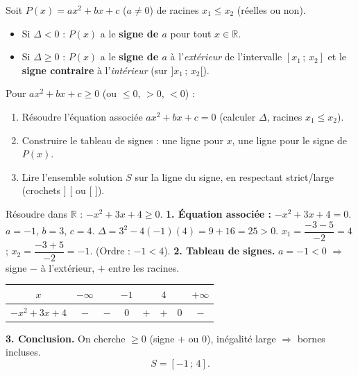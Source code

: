 \documentclass[11pt]{article}
\newcommand{\cle}[1]{{\popxbold\color{popdark}#1}}
\begin{document}
\begin{propriete}
Soit $P(x)=ax^2+bx+c$ ($a\neq 0$) de racines $x_1\leq x_2$ (réelles ou non).
\begin{itemize}
\item Si $\Delta<0$ : $P(x)$ a le \textbf{signe de $a$} pour tout $x\in\mathbb{R}$.
\item Si $\Delta\geq 0$ : $P(x)$ a le \textbf{signe de $a$} à l'\emph{extérieur} de l'intervalle $[x_1\,;\,x_2]$ et le \textbf{signe contraire} à l'\emph{intérieur} (sur $]x_1\,;\,x_2[$).
\end{itemize}
\end{propriete}

\begin{methode}
Pour $ax^2+bx+c \geq 0$ (ou $\leq 0$, $>0$, $<0$) :
\begin{enumerate}
\item Résoudre l'équation associée $ax^2+bx+c=0$ (calculer $\Delta$, racines $x_1\leq x_2$).
\item Construire le \cle{tableau de signes} : une ligne pour $x$, une ligne pour le signe de $P(x)$.
\item Lire l'ensemble solution $S$ sur la ligne du signe, en respectant strict/large (crochets $]$ $[$ ou $[$ $]$).
\end{enumerate}
\end{methode}

\begin{exoresolu}
Résoudre dans $\mathbb{R}$ : $-x^2+3x+4\geq 0$.
\tcblower
\textbf{1. Équation associée :} $-x^2+3x+4=0$. $a=-1$, $b=3$, $c=4$.
$\Delta=3^2-4(-1)(4)=9+16=25>0$.
$x_1=\dfrac{-3-5}{-2}=4$ ; $x_2=\dfrac{-3+5}{-2}=-1$. (Ordre : $-1 < 4$).
\textbf{2. Tableau de signes.} $a=-1<0$ $\Rightarrow$ signe $-$ à l'extérieur, $+$ entre les racines.
\begin{center}
\begin{tabular}{|c|ccccccc|}\hline
$x$ & $-\infty$ & & $-1$ & & $4$ & & $+\infty$ \\ \hline
$-x^2+3x+4$ & $-$ & $-$ & $0$ & $+$ & $+$ & $0$ & $-$ \\ \hline
\end{tabular}
\end{center}
\textbf{3. Conclusion.} On cherche $\geq 0$ (signe $+$ ou $0$), inégalité large $\Rightarrow$ bornes incluses.
\[S=[-1\,;\,4].\]
\end{exoresolu}
\end{document}

